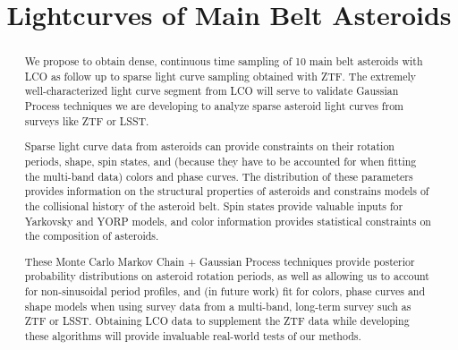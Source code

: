 \documentclass[11pt]{article}
\begin{document}
\title{Lightcurves of Main Belt Asteroids}



%


\begin{abstract}
We propose to obtain dense, continuous time sampling of 10 main belt asteroids with LCO as follow up to sparse light curve sampling obtained with ZTF. The extremely well-characterized light curve segment from LCO will serve to validate Gaussian Process techniques we are developing to analyze sparse asteroid light curves from surveys like ZTF or LSST.

Sparse light curve data from asteroids can provide constraints on their rotation periods, shape, spin states, and 
(because they have to be accounted for when fitting the multi-band data) colors and phase curves. The distribution of
these parameters provides information on the structural properties of asteroids and constrains models of the collisional history
of the asteroid belt. Spin states provide valuable inputs for Yarkovsky and YORP models, and color information provides
statistical constraints on the composition of asteroids. 

These Monte Carlo Markov Chain + Gaussian Process techniques provide posterior probability distributions on asteroid rotation periods, as well as allowing us to account for non-sinusoidal period profiles, and (in future work) fit for colors, phase curves and shape models when using survey data from a multi-band, long-term survey such as ZTF or LSST. Obtaining LCO data to supplement the ZTF data while developing these algorithms will provide invaluable real-world tests of our methods.

\end{abstract}

\end{document}
